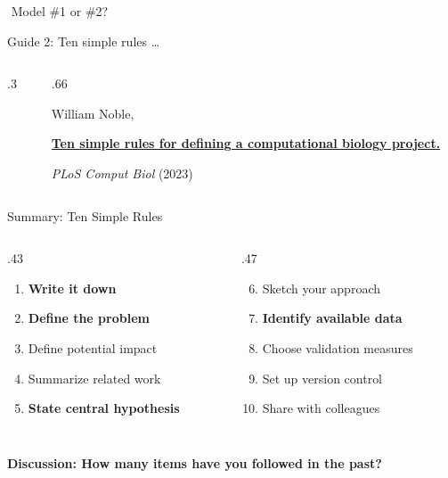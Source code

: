\documentclass[
  12pt,
  ignorenonframetext,
  aspectratio=169]{beamer}
\providecommand{\tightlist}{%
  \setlength{\itemsep}{0pt}\setlength{\parskip}{0pt}}
\begin{document}
\begin{frame}{}
\protect{}\label{section-1}
\huge
\begin{center}
${}$ Model \#1 or \#2?
\end{center}
\end{frame}

\begin{frame}{Guide 2: Ten simple rules \ldots{}}
\protect{}\label{guide-2-ten-simple-rules}
\begin{columns}[T]
\begin{column}{.3\linewidth}
\end{column}

\begin{column}{.66\linewidth}
\large

William Noble,

\href{https://journals.plos.org/ploscompbiol/article?id=10.1371/journal.pcbi.1010786}{\textbf{Ten
simple rules for defining a computational biology project.}}

\emph{PLoS Comput Biol} (2023)

\normalsize
\end{column}
\end{columns}
\end{frame}

\begin{frame}{Summary: Ten Simple Rules}
\protect{}\label{summary-ten-simple-rules}
\large

\begin{columns}[T]
\begin{column}{.43\linewidth}
\begin{enumerate}
\tightlist
\item
  \textbf{\color{teal} Write it down}
\item
  \textbf{\color{teal} Define the problem}
\item
  Define potential impact
\item
  Summarize related work
\item
  \textbf{\color{teal} State central hypothesis}
\end{enumerate}
\end{column}

\begin{column}{.47\linewidth}
\begin{enumerate}
\setcounter{enumi}{5}
\tightlist
\item
  Sketch your approach
\item
  \textbf{\color{teal} Identify available data}
\item
  Choose validation measures
\item
  Set up version control
\item
  Share with colleagues
\end{enumerate}
\end{column}
\end{columns}

\normalsize

\[{}\]

\textbf{\color{blue}\large Discussion: How many items have you followed in the past?}
\end{frame}
\end{document}
